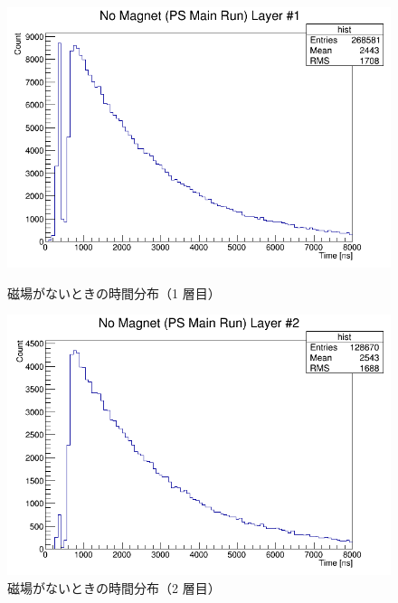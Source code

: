 \begin{figure}[h]
	\centering
	\begin{minipage}{0.45\textwidth}
	\centering
	\includegraphics[width = \textwidth]{figure/odagawa/PSLifetimeDist_Layer0.png}
	\caption{磁場がないときの時間分布（1 層目）}
	\label{fig:PSLifeDist_Layer0}
	\end{minipage}
	\begin{minipage}{0.45\textwidth}
	\centering
	\includegraphics[width = \textwidth]{figure/odagawa/PSLifetimeDist_Layer1.png}
	\caption{磁場がないときの時間分布（2 層目）}
	\label{fig:PSLifeDist_Layer1}
	\end{minipage}
	\begin{minipage}{0.45\textwidth}
	\centering

\end{minipage}
\end{figure}
